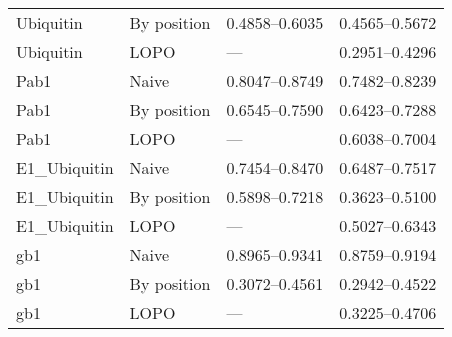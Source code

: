\documentclass[10pt, british]{beamer}
\begin{document}
\begin{frame}
\begin{tabular*}{\linewidth}{@{\extracolsep{\fill}}llll}
		Ubiquitin      & By position & \numrange{0.4858}{0.6035}        & \numrange{0.4565}{0.5672}         \\
		Ubiquitin      & LOPO        & ---                              & \numrange{0.2951}{0.4296}         \\
		Pab1           & Naive       & \numrange{0.8047}{0.8749}        & \numrange{0.7482}{0.8239}         \\
		Pab1           & By position & \numrange{0.6545}{0.7590}        & \numrange{0.6423}{0.7288}         \\
		Pab1           & LOPO        & ---                              & \numrange{0.6038}{0.7004}         \\
		E1\_Ubiquitin  & Naive       & \numrange{0.7454}{0.8470}        & \numrange{0.6487}{0.7517}         \\
		E1\_Ubiquitin  & By position & \numrange{0.5898}{0.7218}        & \numrange{0.3623}{0.5100}         \\
		E1\_Ubiquitin  & LOPO        & ---                              & \numrange{0.5027}{0.6343}         \\
		gb1            & Naive       & \numrange{0.8965}{0.9341}        & \numrange{0.8759}{0.9194}         \\
		gb1            & By position & \numrange{0.3072}{0.4561}        & \numrange{0.2942}{0.4522}         \\
		gb1            & LOPO        & ---                              & \numrange{0.3225}{0.4706}         \\
		\bottomrule
	\end{tabular*}%
\end{frame}
\end{document}
